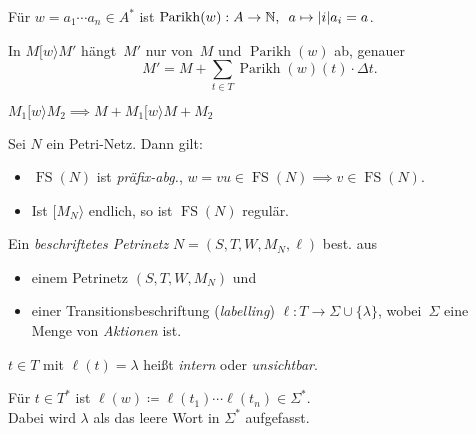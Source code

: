 \documentclass{cheat-sheet}
\newcommand{\activeTransition}[1]{[{#1}\rangle} %
\DeclareMathOperator{\FS}{FS} %
\DeclareMathOperator{\Parikh}{Parikh} %
\begin{document}
\begin{defn}
  Für $w = a_1 \cdots a_n \in A^{*}$ ist $\Parikh(w) : A \to \N, \enspace a \mapsto \card{i}{a_i = a}$.
\end{defn}

\begin{lem}
  In $M \activeTransition{w} M'$ hängt~$M'$ nur von~$M$ und $\Parikh(w)$ ab, genauer
  \[
    M' = M + {\sum}_{t \in T} \Parikh(w)(t) \cdot \Delta t.
  \]
\end{lem}

\begin{lem}
  $M_1 \activeTransition{w} M_2 \implies M + M_1 \activeTransition{w} M + M_2$
\end{lem}


\begin{lem}
  Sei $N$ ein Petri-Netz.
  Dann gilt:
  \begin{itemize}
    \item $\FS(N)$ ist \textit{präfix-abg.}, \dh{} $w = v u \in \FS(N) \implies v \in \FS(N)$.
    \item Ist $\activeTransition{M_N}$ endlich, so ist $\FS(N)$ regulär.
  \end{itemize}
\end{lem}

\begin{defn}
  Ein \emph{beschriftetes Petrinetz} $N = (S, T, W, M_N, \ell)$ best. aus
  \begin{itemize}
    \item einem Petrinetz $(S, T, W, M_N)$ und
    \item einer Transitionsbeschriftung (\textit{labelling}) $\ell : T \to \Sigma \cup \{ \lambda \}$, wobei~$\Sigma$ eine Menge von \textit{Aktionen} ist.
  \end{itemize}
\end{defn}

\begin{sprechweise}
  $t \in T$ mit $\ell(t) = \lambda$ heißt \textit{intern} oder \textit{unsichtbar}.
\end{sprechweise}

\begin{nota}
  \begin{minipage}[t]{0.8 \linewidth}
    Für $t \in T^{*}$ ist $\ell(w) \coloneqq \ell(t_1) \cdots \ell(t_n) \in \Sigma^{*}$. \\
    Dabei wird $\lambda$ als das leere Wort in $\Sigma^{*}$ aufgefasst.
  \end{minipage}
\end{nota}
\end{document}

